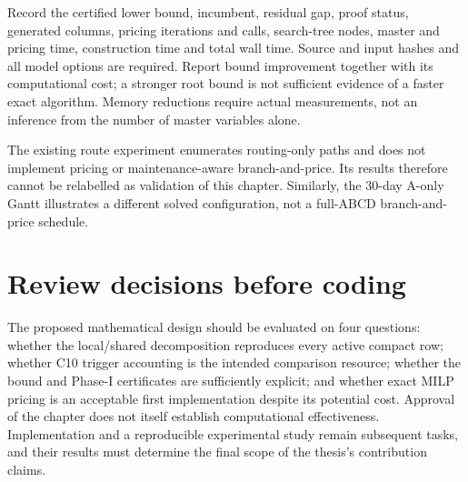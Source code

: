 Record the certified lower bound, incumbent, residual gap, proof status,
generated columns, pricing iterations and calls, search-tree nodes, master
and pricing time, construction time and total wall time. Source and input
hashes and all model options are required. Report bound improvement together
with its computational cost; a stronger root bound is not sufficient evidence
of a faster exact algorithm. Memory reductions require actual measurements,
not an inference from the number of master variables alone.

The existing route experiment enumerates routing-only paths and does not
implement pricing or maintenance-aware branch-and-price. Its results therefore
cannot be relabelled as validation of this chapter. Similarly, the 30-day
A-only Gantt illustrates a different solved configuration, not a full-ABCD
branch-and-price schedule.

\section{Review decisions before coding}
\label{sec:bp_review}

The proposed mathematical design should be evaluated on four questions:
whether the local/shared decomposition reproduces every active compact row;
whether C10 trigger accounting is the intended comparison resource; whether
the bound and Phase-I certificates are sufficiently explicit; and whether
exact MILP pricing is an acceptable first implementation despite its potential
cost. Approval of the chapter does not itself establish computational
effectiveness. Implementation and a reproducible experimental study remain
subsequent tasks, and their results must determine the final scope of the
thesis's contribution claims.